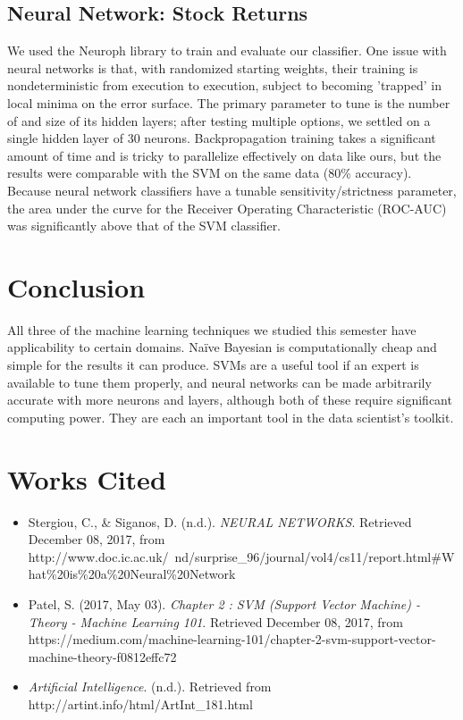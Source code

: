 \documentclass[format=acmlarge]{acmart}
\begin{document}
\subsection{Neural Network: Stock Returns}
We used the Neuroph library to train and evaluate our classifier.  One issue with neural networks is that, with randomized starting weights, their training is nondeterministic from execution to execution, subject to becoming 'trapped' in local minima on the error surface.  The primary parameter to tune is the number of and size of its hidden layers; after testing multiple options, we settled on a single hidden layer of 30 neurons.  Backpropagation training takes a significant amount of time and is tricky to parallelize effectively on data like ours, but the results were comparable with the SVM on the same data (80\% accuracy).  Because neural network classifiers have a tunable sensitivity/strictness parameter, the area under the curve for the Receiver Operating Characteristic (ROC-AUC) was significantly above that of the SVM classifier.

\section{Conclusion}
All three of the machine learning techniques we studied this semester have applicability to certain domains.  Na\"{i}ve Bayesian is computationally cheap and simple for the results it can produce.  SVMs are a useful tool if an expert is available to tune them properly, and neural networks can be made arbitrarily accurate with more neurons and layers, although both of these require significant computing power.  They are each an important tool in the data scientist's toolkit.

\section{Works Cited}
\begin{itemize}
  \item Stergiou, C., \& Siganos, D. (n.d.). \textit{NEURAL NETWORKS}. Retrieved December 08, 2017, from http://www.doc.ic.ac.uk/~nd/surprise\_96/journal/vol4/cs11/report.html\#What\%20is\%20a\%20Neural\%20Network
  \item Patel, S. (2017, May 03). \textit{Chapter 2 : SVM (Support Vector Machine) - Theory - Machine Learning 101}. Retrieved December 08, 2017, from https://medium.com/machine-learning-101/chapter-2-svm-support-vector-machine-theory-f0812effc72
  \item \textit{Artificial Intelligence}. (n.d.). Retrieved from http://artint.info/html/ArtInt\_181.html
\end{itemize}
\end{document}
